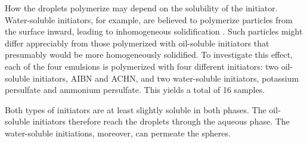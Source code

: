 \documentclass[journal=langd5,manuscript=article,layout=twocolumn]{achemso}
\begin{document}
How the droplets polymerize may depend on the
solubility of the initiator.
Water-soluble initiators, for example, are believed
to polymerize particles from the surface inward,
leading to inhomogeneous solidification \cite{sacanna11}.
Such particles might differ appreciably from
those polymerized with oil-soluble initiators
that presumably would be more homogeneously solidified.
To investigate this effect, each of the four
emulsions is polymerized with four different initiators:
two oil-soluble initiators, AIBN and ACHN,
and two water-soluble  initiators, potassium persulfate 
and ammonium persulfate.
This yields a total of \num{16} samples.

Both types of initiators are at least slightly soluble in
both phases.  The oil-soluble initiators therefore reach the
droplets through the aqueous phase.  The water-soluble
initiations, moreover, can permeate the spheres.
\end{document}
